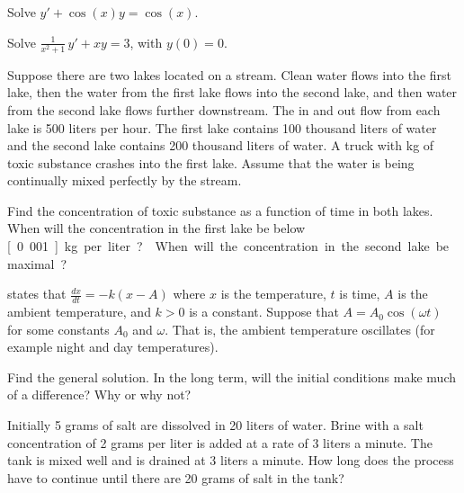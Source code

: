 \begin{exercise}
Solve $y' + \cos (x) y = \cos(x)$.
\end{exercise}

\begin{exercise}
Solve $\frac{1}{x^2+1} \, y' + x y = 3$, with $y(0) = 0$.
\end{exercise}

\begin{exercise}
Suppose there are two lakes located on a stream.  Clean
water flows into the first lake,
then the water from the first lake flows into the second lake, and then
water from the second lake flows further downstream.
The in and out flow from each lake is 500 liters per hour.
The first lake contains 100 thousand liters of water and the
second lake contains 200 thousand liters of water.
A truck with \unit[500]{kg} of toxic substance
crashes into the first lake.  Assume that the water is being continually
mixed perfectly by the stream.
\begin{tasks}
\task Find the concentration of toxic substance
as a function of time in both lakes.
\task When will the
concentration in the first lake be below \unit[0.001]{kg} per liter?
\task When will the
concentration in the second lake be maximal?
\end{tasks}
\end{exercise}

\begin{exercise}
 states that $\frac{dx}{dt} = -k(x-A)$ where
$x$ is the temperature, $t$ is time, $A$ is the ambient temperature,
and $k > 0$ is a constant.
Suppose that $A = A_0 \cos (\omega t)$ for some constants $A_0$ and $\omega$.
That is, the ambient temperature oscillates (for example night and day
temperatures).
\begin{tasks}
\task Find the general solution.
\task In the long term, will the
initial conditions make much of a difference?  Why or why not?
\end{tasks}
\end{exercise}

\begin{exercise}
Initially 5 grams of salt are dissolved in 20 liters of water.  Brine
with a salt concentration of 2 grams per liter is added at a rate
of 3 liters a minute.  The tank is mixed well and is drained at 3 liters
a minute.  How long does the process have to continue until there are 20 grams
of salt in the tank?
\end{exercise}

